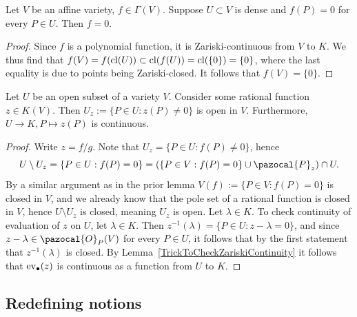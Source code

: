     \begin{lemma}\label{VanishingOnEveryPointInADenseSubsetIsTheSameAsBeingZero}
        Let $V$ be an affine variety, $f\in \Gamma(V)$. Suppose $U\subset V$ is dense and $f(P)=0$ for every $P\in U$. Then $f=0$.
    \end{lemma}
    \begin{proof}
        Since $f$ is a polynomial function, it is Zariski-continuous from $V$ to $K$. We thus find that $f(V)=f(\mathrm{cl}(U))\subset \mathrm{cl}(f(U))=\mathrm{cl}(\{0\})=\{0\}$, where the last equality is due to points being Zariski-closed. It follows that $f(V)=\{0\}$. 
    \end{proof}
    \begin{lemma}\label{ImportantOpenSetAndContinuityOfEvaluationOfRationalFunction}
        Let $U$ be an open subset of a variety $V$. Consider some rational function $z\in K(V)$. Then $U_z:= \{P\in U : z(P)\neq 0\}$ is open in $V$. Furthermore, $U\rightarrow K, P\mapsto z(P)$ is continuous. 
    \end{lemma}
    \begin{proof}
        Write $z= f/g$. Note that $U_z = \{P\in U: f(P)\neq 0\}$, hence 
        $$U\setminus U_z =  \{P \in U : f(P)=0\} = (\{P\in V : f(P) = 0\} \cup \pazocal{P}_z)\cap U.$$ By a similar argument as in the prior lemma $V(f):= \{P\in V: f(P)=0\}$ is closed in $V$, and we already know that the pole set of a rational function is closed in $V$, hence $U\setminus U_z$ is closed, meaning $U_z$ is open. Let $\lambda \in K$. To check continuity of evaluation of $z$ on $U$, let $\lambda \in K$. Then $z^{-1}(\lambda) = \{P \in U : z-\lambda =0\}$, and since $z-\lambda \in \pazocal{O}_P(V)$ for every $P\in U$, it follows that by the first statement that $z^{-1}(\lambda)$ is closed. By Lemma~\ref{TrickToCheckZariskiContinuity} it follows that $\mathrm{ev}_\bullet(z)$ is continuous as a function from $U$ to $K$.
    \end{proof}
    \subsection{Redefining notions}
